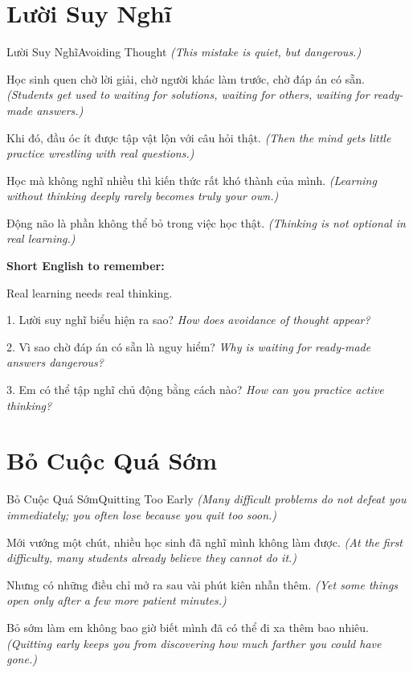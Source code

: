 \section{Lười Suy Nghĩ}
\begin{truyen}{Lười Suy Nghĩ}{Avoiding Thought}
\textit{(This mistake is quiet, but dangerous.)}

Học sinh quen chờ lời giải, chờ người khác làm trước, chờ đáp án có sẵn.
\textit{(Students get used to waiting for solutions, waiting for others, waiting for ready-made answers.)}

Khi đó, đầu óc ít được tập vật lộn với câu hỏi thật.
\textit{(Then the mind gets little practice wrestling with real questions.)}

Học mà không nghĩ nhiều thì kiến thức rất khó thành của mình.
\textit{(Learning without thinking deeply rarely becomes truly your own.)}
\end{truyen}

\begin{baihoc}
Động não là phần không thể bỏ trong việc học thật.
\textit{(Thinking is not optional in real learning.)}
\end{baihoc}

\begin{ghinhoanh}
\textbf{Short English to remember:}

Real learning needs real thinking.

\end{ghinhoanh}

\begin{tuhocnhanh}
1. Lười suy nghĩ biểu hiện ra sao? \textit{How does avoidance of thought appear?}

2. Vì sao chờ đáp án có sẵn là nguy hiểm? \textit{Why is waiting for ready-made answers dangerous?}

3. Em có thể tập nghĩ chủ động bằng cách nào? \textit{How can you practice active thinking?}
\end{tuhocnhanh}
\ngancach

\section{Bỏ Cuộc Quá Sớm}
\begin{truyen}{Bỏ Cuộc Quá Sớm}{Quitting Too Early}
\textit{(Many difficult problems do not defeat you immediately; you often lose because you quit too soon.)}

Mới vướng một chút, nhiều học sinh đã nghĩ mình không làm được.
\textit{(At the first difficulty, many students already believe they cannot do it.)}

Nhưng có những điều chỉ mở ra sau vài phút kiên nhẫn thêm.
\textit{(Yet some things open only after a few more patient minutes.)}

Bỏ sớm làm em không bao giờ biết mình đã có thể đi xa thêm bao nhiêu.
\textit{(Quitting early keeps you from discovering how much farther you could have gone.)}
\end{truyen}

